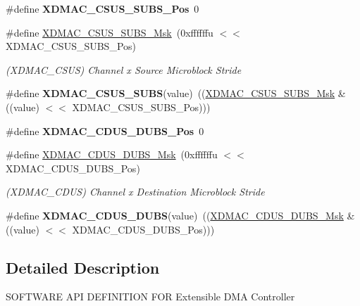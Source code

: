 \begin{DoxyCompactItemize}
\item 
\mbox{\label{group__SAME70__XDMAC_gabe71a37896283684f0eb00b83369ff5c}} 
\#define {\bfseries X\+D\+M\+A\+C\+\_\+\+C\+S\+U\+S\+\_\+\+S\+U\+B\+S\+\_\+\+Pos}~0
\item 
\mbox{\label{group__SAME70__XDMAC_gad45ae394b8779c0dadfc72dc107bdf43}} 
\#define \mbox{\hyperlink{group__SAME70__XDMAC_gad45ae394b8779c0dadfc72dc107bdf43}{X\+D\+M\+A\+C\+\_\+\+C\+S\+U\+S\+\_\+\+S\+U\+B\+S\+\_\+\+Msk}}~(0xffffffu $<$$<$ X\+D\+M\+A\+C\+\_\+\+C\+S\+U\+S\+\_\+\+S\+U\+B\+S\+\_\+\+Pos)
\begin{DoxyCompactList}\small\item\em (X\+D\+M\+A\+C\+\_\+\+C\+S\+US) Channel x Source Microblock Stride \end{DoxyCompactList}\item 
\mbox{\label{group__SAME70__XDMAC_ga49299293673411271ca686591bd59e14}} 
\#define {\bfseries X\+D\+M\+A\+C\+\_\+\+C\+S\+U\+S\+\_\+\+S\+U\+BS}(value)~((\mbox{\hyperlink{group__SAMV71__XDMAC_gad45ae394b8779c0dadfc72dc107bdf43}{X\+D\+M\+A\+C\+\_\+\+C\+S\+U\+S\+\_\+\+S\+U\+B\+S\+\_\+\+Msk}} \& ((value) $<$$<$ X\+D\+M\+A\+C\+\_\+\+C\+S\+U\+S\+\_\+\+S\+U\+B\+S\+\_\+\+Pos)))
\item 
\mbox{\label{group__SAME70__XDMAC_ga6273e9fa1812798d1fb408bc771f132e}} 
\#define {\bfseries X\+D\+M\+A\+C\+\_\+\+C\+D\+U\+S\+\_\+\+D\+U\+B\+S\+\_\+\+Pos}~0
\item 
\mbox{\label{group__SAME70__XDMAC_gaca37f4c47181b3ab679d04c10bf1acb4}} 
\#define \mbox{\hyperlink{group__SAME70__XDMAC_gaca37f4c47181b3ab679d04c10bf1acb4}{X\+D\+M\+A\+C\+\_\+\+C\+D\+U\+S\+\_\+\+D\+U\+B\+S\+\_\+\+Msk}}~(0xffffffu $<$$<$ X\+D\+M\+A\+C\+\_\+\+C\+D\+U\+S\+\_\+\+D\+U\+B\+S\+\_\+\+Pos)
\begin{DoxyCompactList}\small\item\em (X\+D\+M\+A\+C\+\_\+\+C\+D\+US) Channel x Destination Microblock Stride \end{DoxyCompactList}\item 
\mbox{\label{group__SAME70__XDMAC_ga7645600da33407dcf7645fefa9959938}} 
\#define {\bfseries X\+D\+M\+A\+C\+\_\+\+C\+D\+U\+S\+\_\+\+D\+U\+BS}(value)~((\mbox{\hyperlink{group__SAMV71__XDMAC_gaca37f4c47181b3ab679d04c10bf1acb4}{X\+D\+M\+A\+C\+\_\+\+C\+D\+U\+S\+\_\+\+D\+U\+B\+S\+\_\+\+Msk}} \& ((value) $<$$<$ X\+D\+M\+A\+C\+\_\+\+C\+D\+U\+S\+\_\+\+D\+U\+B\+S\+\_\+\+Pos)))
\end{DoxyCompactItemize}


\subsection{Detailed Description}
S\+O\+F\+T\+W\+A\+RE A\+PI D\+E\+F\+I\+N\+I\+T\+I\+ON F\+OR Extensible D\+MA Controller 